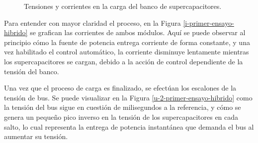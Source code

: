 \begin{figure}[hbt!]
  \centering
  \caption{Tensiones y corrientes en la carga del banco de supercapacitores.}
  \label{primer-ensayo-hibrido}
\end{figure}

Para entender con mayor claridad el proceso, en la Figura \ref{i-primer-ensayo-hibrido} se grafican las corrientes de ambos módulos. Aquí se puede observar al principio cómo la fuente de potencia entrega corriente de forma constante, y una vez habilitado el control automático, la corriente disminuye lentamente mientras los supercapacitores se cargan, debido a la acción de control dependiente de la tensión del banco.

Una vez que el proceso de carga es finalizado, se efectúan los escalones de la tensión de bus. Se puede visualizar en la Figura \ref{u-2-primer-ensayo-hibrido} como la tensión del bus sigue en cuestión de milisegundos a la referencia, y cómo se genera un pequeño pico inverso en la tensión de los supercapacitores en cada salto, lo cual representa la entrega de potencia instantánea que demanda el bus al aumentar su tensión.

